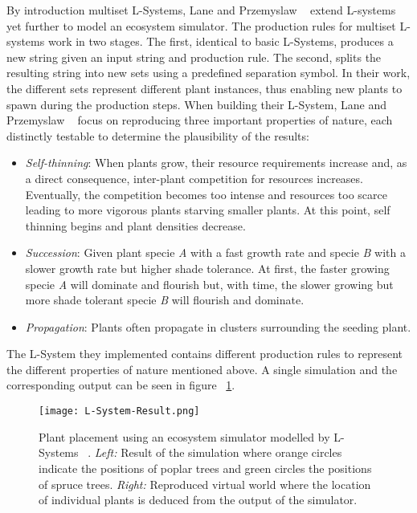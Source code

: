 By introduction multiset L-Systems, Lane and Przemyslaw ~\cite{Lane2002} extend L-systems yet further to model an ecosystem simulator. The production rules for multiset L-systems work in two stages. The first, identical to basic L-Systems, produces a new string given an input string and production rule. The second, splits the resulting string into new sets using a predefined separation symbol. In their work, the different sets represent different plant instances, thus enabling new plants to spawn during the production steps. When building their L-System, Lane and Przemyslaw ~\cite{Lane2002} focus on reproducing three important properties of nature, each distinctly testable to determine the plausibility of the results:
\begin{itemize}
\item \textit{Self-thinning}: When plants grow, their resource requirements increase and, as a direct consequence, inter-plant competition for resources increases. Eventually, the competition becomes too intense and resources too scarce leading to more vigorous plants starving smaller plants. At this point, self thinning begins and plant densities decrease.
\item \textit{Succession}: Given plant specie \textit{A} with a fast growth rate and specie \textit{B} with a slower growth rate but higher shade tolerance. At first, the faster growing specie \textit{A} will dominate and flourish but, with time, the slower growing but more shade tolerant specie \textit{B} will flourish and dominate.
\item \textit{Propagation}: Plants often propagate in clusters surrounding the seeding plant.
\end{itemize}

The L-System they implemented contains different production rules to represent the different properties of nature mentioned above. A single simulation and the corresponding output can be seen in figure ~\ref{Plant placement using an ecosystem simulator modelled by L-System}.

\begin{figure}[h]
  \centering
    \texttt{[image: L-System-Result.png]}
    \caption[Plant placement using an ecosystem simulator modelled by L-Systems]{ Plant placement using an ecosystem simulator modelled by L-Systems ~\cite{Lane2002}. \textit{Left:} Result of the simulation where orange circles indicate the positions of poplar trees and green circles the positions of spruce trees. \textit{Right:} Reproduced virtual world where the location of individual plants is deduced from the output of the simulator.}
    \label{Plant placement using an ecosystem simulator modelled by L-System}
\end{figure}

